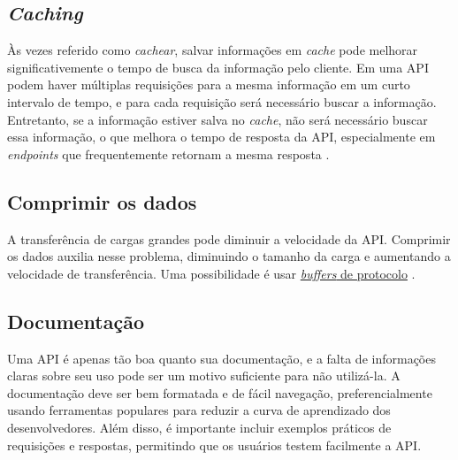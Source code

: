 

\subsection{\emph{Caching}}
Às vezes referido como \emph{cachear}, salvar informações em \emph{cache} pode melhorar significativemente o tempo de busca da informação pelo cliente. Em uma API podem haver múltiplas requisições para a mesma informação em um curto intervalo de tempo, e para cada requisição será necessário buscar a informação. Entretanto, se a informação estiver salva no \emph{cache}, não será necessário buscar essa informação, o que melhora o tempo de resposta da API, especialmente em \emph{endpoints} que frequentemente retornam a mesma resposta \cite{api-design-restfulapi}.

\subsection{Comprimir os dados}
A transferência de cargas grandes pode diminuir a velocidade da API. Comprimir os dados auxilia nesse problema, diminuindo o tamanho da carga e aumentando a velocidade de transferência. Uma possibilidade é usar \hyperref[subsecao-trocas-de-dados]{\emph{buffers} de protocolo} \cite{api-design-restfulapi}.

\subsection{Documentação}
Uma API é apenas tão boa quanto sua documentação, e a falta de informações claras sobre seu uso pode ser um motivo suficiente para não utilizá-la. A documentação deve ser bem formatada e de fácil navegação, preferencialmente usando ferramentas populares para reduzir a curva de aprendizado dos desenvolvedores. Além disso, é importante incluir exemplos práticos de requisições e respostas, permitindo que os usuários testem facilmente a API. \cite{api-design-restfulapi}

